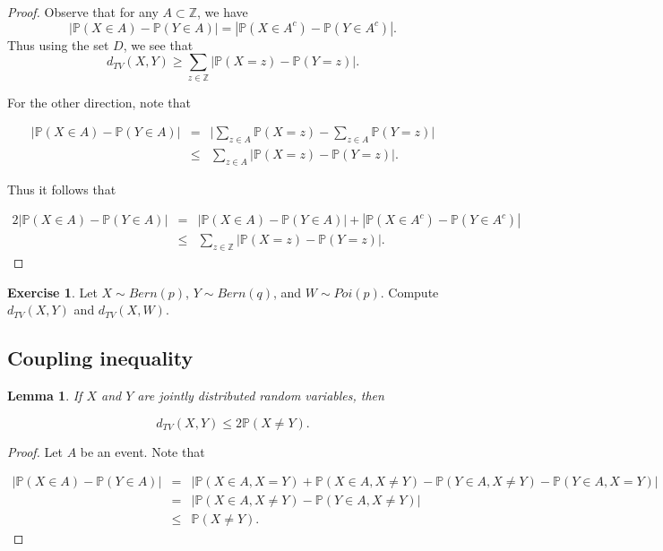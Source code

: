 \documentclass[
]{article}
\newtheorem{lemma}{Lemma}[section]
\theoremstyle{definition}
\theoremstyle{definition}
\theoremstyle{definition}
\newtheorem{exercise}{Exercise}[section]
\theoremstyle{remark}
\begin{document}
\begin{proof}
\iffalse{} {Proof. } \fi{}Observe that for any \(A \subset \mathbb{Z}\), we have
\[|\mathbb{P}(X \in A) - \mathbb{P}(Y \in A)| = |\mathbb{P}(X \in A^c) - \mathbb{P}(Y\in A^c)|.\]
Thus using the set \(D\), we see that
\[d_{TV}(X,Y) \geq \sum_{z \in \mathbb{Z}} | \mathbb{P}(X=z) - \mathbb{P}(Y=z)|.\]

For the other direction, note that

\begin{eqnarray*}
        |\mathbb{P}(X \in A) - \mathbb{P}(Y \in A)| &=& \big|\sum_{z \in A} \mathbb{P}(X =z) - \sum_{z \in A} \mathbb{P}(Y=z) \big| \\
        &\leq& \sum_{z \in A} |\mathbb{P}(X=z) - \mathbb{P}(Y=z)|.
\end{eqnarray*}

Thus it follows that

\begin{eqnarray*}
    2| \mathbb{P}(X \in A) - \mathbb{P}(Y \in A)| 
&=& |\mathbb{P}(X \in A) - \mathbb{P}(Y \in A)| + |\mathbb{P}(X \in A^c)  - \mathbb{P}(Y \in A^c)| \\
        &\leq&   \sum_{z \in \mathbb{Z}} |\mathbb{P}(X=z) - \mathbb{P}(Y=z)|.
    \end{eqnarray*}
\end{proof}

\begin{exercise}
\protect\hypertarget{exr:unnamed-chunk-7}{}{\label{exr:unnamed-chunk-7} }Let \(X \sim Bern(p)\), \(Y \sim Bern(q)\), and \(W \sim Poi(p)\). Compute
\(d_{TV}(X,Y)\) and \(d_{TV}(X, W).\)\\
\end{exercise}

\hypertarget{coupling-inequality}{%
\subsection{Coupling inequality}\label{coupling-inequality}}

\begin{lemma}
\protect\hypertarget{lem:unnamed-chunk-8}{}{\label{lem:unnamed-chunk-8} }If \(X\) and \(Y\) are jointly distributed random variables, then

\[d_{TV}(X,Y) \leq 2\mathbb{P}(X \not = Y).\]
\end{lemma}

\begin{proof}
\iffalse{} {Proof. } \fi{}Let \(A\) be an event. Note that

\begin{eqnarray*}
        |\mathbb{P}(X \in A) - \mathbb{P}(Y \in A)|
    &=& \Big| \mathbb{P}(X \in A, X = Y) +  \mathbb{P}(X \in A, X\not = Y) -   \mathbb{P}(Y \in A, X\not = Y)- \mathbb{P}(Y \in A, X = Y) \Big| \\
        &=&   |\mathbb{P}(X \in A, X \not = Y) -  \mathbb{P}(Y \in A, X\not = Y) | \\
        &\leq&
        \mathbb{P}(X \not = Y).
    \end{eqnarray*}
\end{proof}
\end{document}

